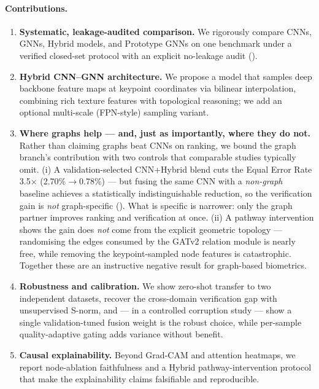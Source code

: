 \documentclass[11pt]{article}
\begin{document}
\paragraph{Contributions.}
\begin{enumerate}\itemsep2pt
  \item \textbf{Systematic, leakage-audited comparison.} We rigorously compare CNNs,
  GNNs, Hybrid models, and Prototype GNNs on one benchmark under a verified closed-set
  protocol with an explicit no-leakage audit ().
  \item \textbf{Hybrid CNN--GNN architecture.} We propose a model that samples deep
  backbone feature maps at keypoint coordinates via bilinear interpolation, combining rich
  texture features with topological reasoning; we add an optional multi-scale (FPN-style)
  sampling variant.
  \item \textbf{Where graphs help --- and, just as importantly, where they do not.} Rather than claiming graphs beat CNNs on ranking, we bound the graph branch's contribution with two controls that comparable studies typically omit. (i) A validation-selected CNN+Hybrid blend cuts the Equal Error Rate 3.5$\times$ (2.70\%$\to$0.78\%) --- but fusing the same CNN with a \emph{non-graph} baseline achieves a statistically indistinguishable reduction, so the verification gain is \emph{not} graph-specific (). What is specific is narrower: only the graph partner improves ranking and verification at once. (ii) A pathway intervention shows the gain does \emph{not} come from the explicit geometric topology --- randomising the edges consumed by the GATv2 relation module is nearly free, while removing the keypoint-sampled node features is catastrophic. Together these are an instructive negative result for graph-based biometrics.
  \item \textbf{Robustness and calibration.} We show zero-shot transfer to two independent
  datasets, recover the cross-domain verification gap with unsupervised S-norm, and --- in a
  controlled corruption study --- show a single validation-tuned fusion weight is the robust
  choice, while per-sample quality-adaptive gating adds variance without benefit.
  \item \textbf{Causal explainability.} Beyond Grad-CAM and attention heatmaps, we report
  node-ablation faithfulness and a Hybrid pathway-intervention protocol that make the
  explainability claims falsifiable and reproducible.
\end{enumerate}
\end{document}
